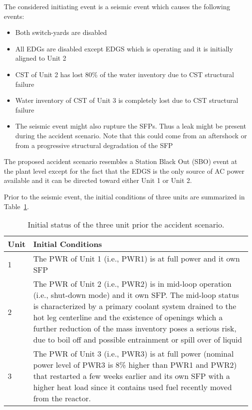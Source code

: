 The considered initiating event is a seismic event which causes the following events:
\begin{itemize}
  \item Both switch-yards are disabled
  \item All EDGs are disabled except EDGS which is operating and it is initially aligned to Unit 2
  \item CST of Unit 2 has lost 80\% of the water inventory due to CST structural failure
  \item Water inventory of CST of Unit 3 is completely lost due to CST structural failure
  \item The seismic event might also rupture the SFPs. Thus a leak might be present during the accident scenario.
        Note that this could come from an aftershock or from a progressive structural degradation of the SFP
\end{itemize}

The proposed accident scenario resembles a Station Black Out (SBO) event at the plant level except for the 
fact that the EDGS is the only source of AC power available and it can be directed toward either Unit 1 or Unit 2.

Prior to the seismic event, the initial conditions of three units are summarized in Table~\ref{tab:unitsStatus}.

\begin{table}
  \begin{tabular}{ | l | p{10cm} | }
    \hline      
      \textbf{Unit} & \textbf{Initial Conditions} \\
      \hline \hline
      1 &       The PWR of Unit 1 (i.e., PWR1) is at full power and it own SFP \\ \hline
      2 &       The PWR of Unit 2 (i.e., PWR2) is in mid-loop operation (i.e., shut-down mode) and it own SFP. 
                The mid-loop status is characterized by a primary coolant system drained to the 
                hot leg centerline and the existence of openings which a further reduction of 
                the mass inventory poses a serious risk, due to boil off and possible entrainment 
                or spill over of liquid\\ \hline
      3 &       The PWR of Unit 3 (i.e., PWR3) is at full power (nominal power level of PWR3 is 8\% higher than 
                PWR1 and PWR2) that restarted a few weeks 
                earlier and its own SFP with a higher heat load since it contains used fuel recently 
                moved from the reactor. \\
    \hline  
  \end{tabular}
  \caption{Initial status of the three unit prior the accident scenario.}
  \label{tab:unitsStatus}
\end{table}

